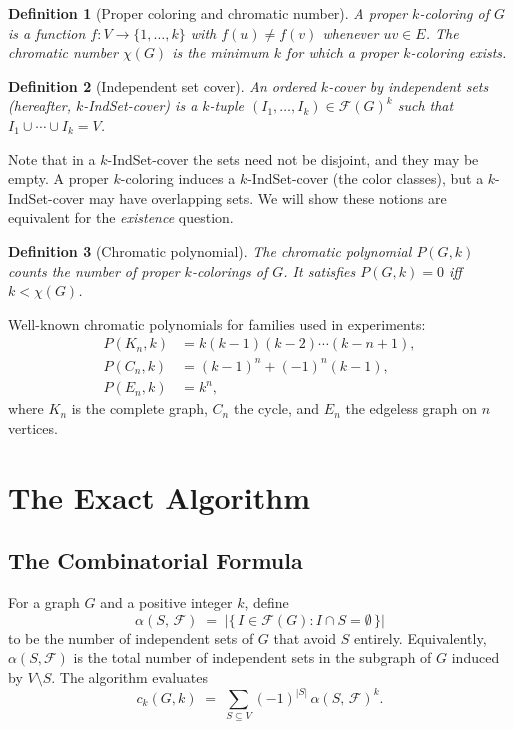 \documentclass[11pt]{article}
\newtheorem{definition}{Definition}
\begin{document}
\begin{definition}[Proper coloring and chromatic number]
  A \emph{proper $k$-coloring} of $G$ is a function $f: V \to \{1,\ldots,k\}$
  with $f(u) \neq f(v)$ whenever $uv \in E$.  The \emph{chromatic number}
  $\chi(G)$ is the minimum $k$ for which a proper $k$-coloring exists.
\end{definition}

\begin{definition}[Independent set cover]
  An \emph{ordered $k$-cover by independent sets} (hereafter, $k$-IndSet-cover) is
  a $k$-tuple $(I_1, \ldots, I_k) \in \mathcal{F}(G)^k$ such that
  $I_1 \cup \cdots \cup I_k = V$.
\end{definition}

Note that in a $k$-IndSet-cover the sets need not be disjoint, and they may be
empty.  A proper $k$-coloring induces a $k$-IndSet-cover (the color classes), but
a $k$-IndSet-cover may have overlapping sets.  We will show these notions are
equivalent for the \emph{existence} question.

\begin{definition}[Chromatic polynomial]
  The \emph{chromatic polynomial} $P(G, k)$ counts the number of proper
  $k$-colorings of $G$.  It satisfies $P(G, k) = 0$ iff $k < \chi(G)$.
\end{definition}

Well-known chromatic polynomials for families used in experiments:
\begin{align*}
  P(K_n, k)   &= k(k-1)(k-2)\cdots(k-n+1), \\
  P(C_n, k)   &= (k-1)^n + (-1)^n(k-1),    \\
  P(E_n, k)   &= k^n,
\end{align*}
where $K_n$ is the complete graph, $C_n$ the cycle, and $E_n$ the edgeless
graph on $n$ vertices.

\section{The Exact Algorithm}\label{sec:algorithm}

\subsection{The Combinatorial Formula}

For a graph $G$ and a positive integer $k$, define
\[
  \alpha(S,\,\mathcal{F}) \;=\;
    \bigl|\{\,I \in \mathcal{F}(G) : I \cap S = \emptyset\,\}\bigr|
\]
to be the number of independent sets of $G$ that avoid $S$ entirely.
Equivalently, $\alpha(S,\mathcal{F})$ is the total number of independent sets
in the subgraph of $G$ induced by $V \setminus S$.  The algorithm evaluates
\begin{equation}\label{eq:ck}
  c_k(G, k)
  \;=\;
  \sum_{S \subseteq V} (-1)^{|S|}\,\alpha(S,\,\mathcal{F})^k.
\end{equation}
\end{document}
